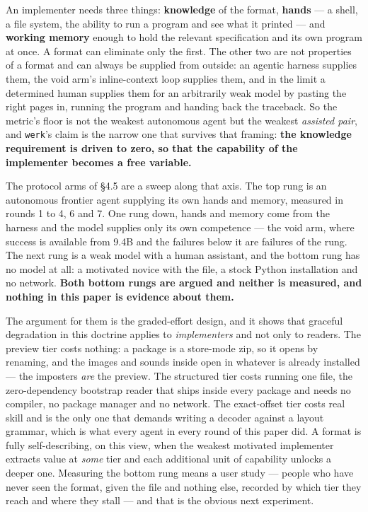 \documentclass[10pt,twocolumn,letterpaper]{article}
\newcommand{\code}[1]{\texttt{\small #1}}
\begin{document}
An implementer needs three things: \textbf{knowledge} of the format, \textbf{hands} --- a shell, a file system, the ability to run a program and see what it printed --- and \textbf{working memory} enough to hold the relevant specification and its own program at once. A format can eliminate only the first. The other two are not properties of a format and can always be supplied from outside: an agentic harness supplies them, the void arm's inline-context loop supplies them, and in the limit a determined human supplies them for an arbitrarily weak model by pasting the right pages in, running the program and handing back the traceback. So the metric's floor is not the weakest autonomous agent but the weakest \emph{assisted pair}, and \code{werk}'s claim is the narrow one that survives that framing: \textbf{the knowledge requirement is driven to zero, so that the capability of the implementer becomes a free variable.}

The protocol arms of \S4.5 are a sweep along that axis. The top rung is an autonomous frontier agent supplying its own hands and memory, measured in rounds 1 to 4, 6 and 7. One rung down, hands and memory come from the harness and the model supplies only its own competence --- the void arm, where success is available from 9.4B and the failures below it are failures of the rung. The next rung is a weak model with a human assistant, and the bottom rung has no model at all: a motivated novice with the file, a stock Python installation and no network. \textbf{Both bottom rungs are argued and neither is measured, and nothing in this paper is evidence about them.}

The argument for them is the graded-effort design, and it shows that graceful degradation in this doctrine applies to \emph{implementers} and not only to readers. The preview tier costs nothing: a package is a store-mode zip, so it opens by renaming, and the images and sounds inside open in whatever is already installed --- the imposters \emph{are} the preview. The structured tier costs running one file, the zero-dependency bootstrap reader that ships inside every package and needs no compiler, no package manager and no network. The exact-offset tier costs real skill and is the only one that demands writing a decoder against a layout grammar, which is what every agent in every round of this paper did. A format is fully self-describing, on this view, when the weakest motivated implementer extracts value at \emph{some} tier and each additional unit of capability unlocks a deeper one. Measuring the bottom rung means a user study --- people who have never seen the format, given the file and nothing else, recorded by which tier they reach and where they stall --- and that is the obvious next experiment.
\end{document}
